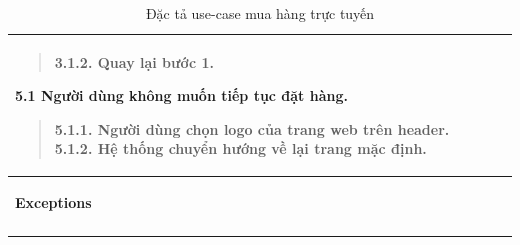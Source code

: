 {\begin{longtable}{| p{} | p{} |}
\begin{quote}
            3.1.2. Quay lại bước 1.
        \end{quote}
        5.1 Người dùng không muốn tiếp tục đặt hàng.
        \begin{quote}
            5.1.1. Người dùng chọn logo của trang web trên header.
            5.1.2. Hệ thống chuyển hướng về lại trang mặc định.
        \end{quote}
        \\
        \hline
        \begin{flushleft}
            \textbf{Exceptions}
        \end{flushleft}
         &
        \\
        \hline
        \caption{Đặc tả use-case mua hàng trực tuyến}
    \end{longtable}
}
